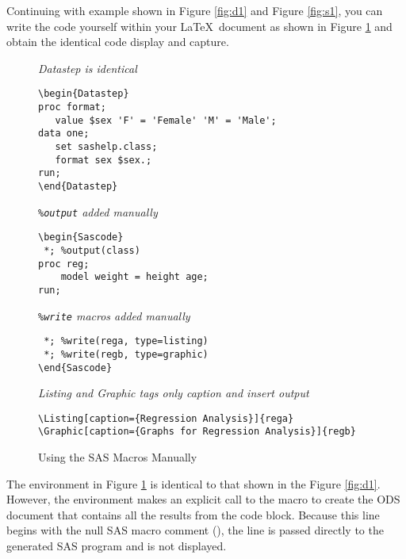 \documentclass[article,oneside]{memoir}
\begin{document}
  Continuing with example shown in Figure \ref{fig:d1} and Figure \ref{fig:s1},
  you can write the code yourself within your
  \LaTeX\ document as shown in Figure \ref{fig:manual}
  and obtain the identical code display and capture.

\begin{figure}[H]
\begin{framed}
\begin{snugshade}
{\hfil\textit{Datastep is identical}\hfil}
\begin{verbatim}
\begin{Datastep}
proc format;
   value $sex 'F' = 'Female' 'M' = 'Male';
data one;
   set sashelp.class;
   format sex $sex.;
run;
\end{Datastep}
\end{verbatim}
\end{snugshade}
\begin{snugshade}
{\hfil\textit{\texttt{\%output} added manually}\hfil}
\begin{verbatim}
\begin{Sascode}
 *; %output(class)
proc reg;
    model weight = height age;
run;
\end{verbatim}
\end{snugshade}
\begin{snugshade}
{\hfil\textit{\texttt{\%write} macros added manually}\hfil}
\begin{verbatim}
 *; %write(rega, type=listing)
 *; %write(regb, type=graphic)
\end{Sascode}
\end{verbatim}
\end{snugshade}
\begin{snugshade}
{\hfil\textit{Listing and Graphic tags only caption and insert output}\hfil}
\begin{verbatim}
\Listing[caption={Regression Analysis}]{rega}
\Graphic[caption={Graphs for Regression Analysis}]{regb}
\end{verbatim}
\end{snugshade}
\end{framed}
\caption{Using the SAS Macros Manually}\label{fig:manual}
\end{figure}

  The  environment in Figure \ref{fig:manual} is identical to that shown in the
  Figure \ref{fig:d1}. However, the 
  environment makes an explicit call to the  macro to create
  the ODS document that contains all the results from the code block.
  Because this line begins with the null SAS macro comment (\Code{\%*;}), the line
  is passed directly to the generated SAS program and is not displayed.
\end{document}
